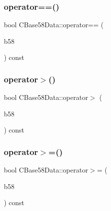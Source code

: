 \subsubsection{\texorpdfstring{operator==()}{operator==()}}
{\footnotesize\ttfamily bool C\+Base58\+Data\+::operator== (\begin{DoxyParamCaption}\item[{const \mbox{\hyperlink{class_c_base58_data}{C\+Base58\+Data}} \&}]{b58 }\end{DoxyParamCaption}) const\hspace{0.3cm}{\ttfamily [inline]}}

\mbox{\label{class_c_base58_data_a7d8052eacc8de55a0f4ec91306dfbec3}} 
\subsubsection{\texorpdfstring{operator$>$()}{operator>()}}
{\footnotesize\ttfamily bool C\+Base58\+Data\+::operator$>$ (\begin{DoxyParamCaption}\item[{const \mbox{\hyperlink{class_c_base58_data}{C\+Base58\+Data}} \&}]{b58 }\end{DoxyParamCaption}) const\hspace{0.3cm}{\ttfamily [inline]}}

\mbox{\label{class_c_base58_data_a0cac1805398e2b09a498ba884c7a0057}} 
\subsubsection{\texorpdfstring{operator$>$=()}{operator>=()}}
{\footnotesize\ttfamily bool C\+Base58\+Data\+::operator$>$= (\begin{DoxyParamCaption}\item[{const \mbox{\hyperlink{class_c_base58_data}{C\+Base58\+Data}} \&}]{b58 }\end{DoxyParamCaption}) const\hspace{0.3cm}{\ttfamily [inline]}}

\mbox{\label{class_c_base58_data_afab1c06a0a4f631fd889434a2bc48c27}} 
